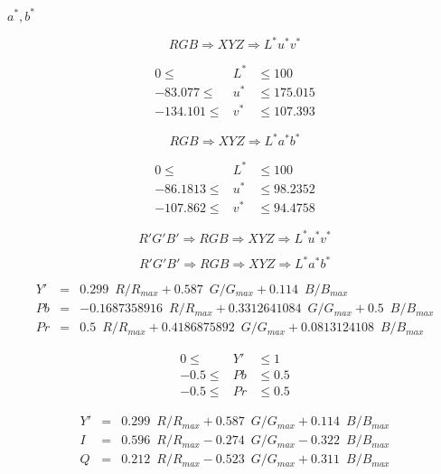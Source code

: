 \documentclass{article}
\begin{document}
$a^{*}, b^{*}$
\pagebreak

\[ RGB \Rightarrow XYZ \Rightarrow L^*u^*v^* \]
\pagebreak

\[ \begin{array}{rcl} 0 \leq & L^* & \leq 100 \\ -83.077 \leq & u^* & \leq 175.015 \\ -134.101 \leq & v^* & \leq 107.393 \end{array} \]
\pagebreak

\[ RGB \Rightarrow XYZ \Rightarrow L^*a^*b^* \]
\pagebreak

\[ \begin{array}{rcl} 0 \leq & L^* & \leq 100 \\ -86.1813 \leq & u^* & \leq 98.2352 \\ -107.862 \leq & v^* & \leq 94.4758 \end{array} \]
\pagebreak

\[ R'G'B' \Rightarrow RGB \Rightarrow XYZ \Rightarrow L^*u^*v^* \]
\pagebreak

\[ R'G'B' \Rightarrow RGB \Rightarrow XYZ \Rightarrow L^*a^*b^* \]
\pagebreak

\[ \begin{array}{rcl} Y' & = & 0.299\enspace R / R_{max} + 0.587\enspace G / G_{max} + 0.114\enspace B / B_{max}\\ Pb & = & -0.1687358916\enspace R / R_{max} + 0.3312641084\enspace G / G_{max} + 0.5\enspace B / B_{max} \\ Pr & = & 0.5\enspace R / R_{max} + 0.4186875892\enspace G / G_{max} + 0.0813124108\enspace B / B_{max} \end{array} \]
\pagebreak

\[ \begin{array}{rcl} 0 \leq & Y' & \leq 1 \\ -0.5 \leq & Pb & \leq 0.5 \\ -0.5 \leq & Pr & \leq 0.5 \end{array} \]
\pagebreak

\[ \begin{array}{rcl} Y' & = & 0.299\enspace R / R_{max} + 0.587\enspace G / G_{max} + 0.114\enspace B / B_{max}\\ I & = & 0.596\enspace R / R_{max} - 0.274\enspace G / G_{max} - 0.322\enspace B / B_{max} \\ Q & = & 0.212\enspace R / R_{max} - 0.523\enspace G / G_{max} + 0.311\enspace B / B_{max} \end{array} \]
\pagebreak
\end{document}
